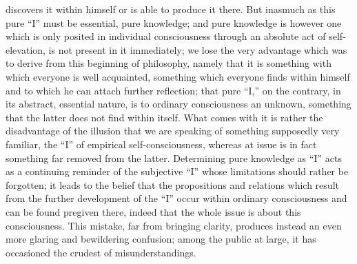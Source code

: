 discovers it within himself
or is able to produce it there.
But inasmuch as this pure “I” must be essential, pure knowledge;
and pure knowledge is however one which is only posited in
individual consciousness through an absolute act of self-elevation,
is not present in it immediately;
we lose the very advantage which was to derive
from this beginning of philosophy,
namely that it is something with which
everyone is well acquainted,
something which everyone finds within himself
and to which he can attach further reflection;
that pure “I,” on the contrary,
in its abstract, essential nature,
is to ordinary consciousness an unknown,
something that the latter does not find within itself.
What comes with it is rather the disadvantage of
the illusion that we are speaking of something supposedly very familiar,
the “I” of empirical self-consciousness,
whereas at issue is in fact something far removed from the latter.
Determining pure knowledge as “I” acts as
a continuing reminder of the subjective “I”
whose limitations should rather be forgotten;
it leads to the belief that the propositions and relations
which result from the further development
of the “I” occur within ordinary consciousness
and can be found pregiven there,
indeed that the whole issue is about this consciousness.
This mistake, far from bringing clarity,
produces instead an even more glaring and bewildering confusion;
among the public at large, it has occasioned
the crudest of misunderstandings.

